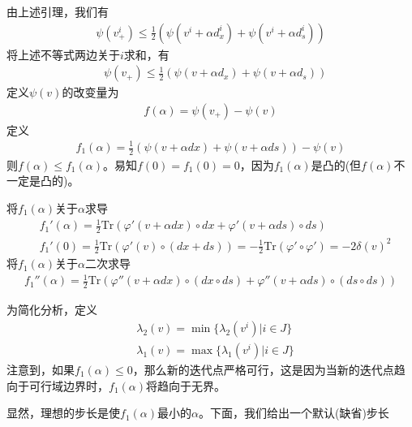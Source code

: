             \par
            由上述引理，我们有
            \begin{align*}
            \psi(v_{+}^i)\leqslant \frac 12 (\psi(v^i+\alpha d_x^i)+\psi(v^i+\alpha d_s^i))
            \end{align*}
            将上述不等式两边关于$i$求和，有
            \begin{align*}
            & \psi(v_{+})\leqslant \frac 12 (\psi(v+\alpha d_x)+\psi(v+\alpha d_s))
            \end{align*}
            定义$\psi(v)$的改变量为
            \begin{align*}
            f(\alpha)=\psi(v_{+})-\psi(v)
            \end{align*}
            定义
            \begin{align*}
            f_1(\alpha)=\frac 12 (\psi(v+\alpha dx)+\psi(v+\alpha ds))-\psi(v)
            \end{align*}
            则$f(\alpha)\leqslant f_1(\alpha)$。易知$f(0)=f_1(0)=0$，因为$f_1(\alpha)$是凸的(但$f(\alpha)$不一定是凸的)。
            \par
            将$f_1(\alpha)$关于${\alpha}$求导
            \begin{align*}
            & f_1'(\alpha)=\frac 12 \mathrm{Tr}(\varphi'(v+\alpha dx)\circ dx+\varphi'(v+\alpha ds)\circ ds)\\
            & f_1'(0)=\frac 12 \mathrm{Tr}(\varphi'(v)\circ(dx +ds))=-\frac 12 \mathrm{Tr}(\varphi'\circ\varphi' )=-2\delta (v)^2
            \end{align*}
            将$f_1(\alpha)$关于${\alpha}$二次求导
            \begin{align*}
            f_1''(\alpha)=\frac 12 \mathrm{Tr}(\varphi''(v+\alpha dx)\circ (dx\circ ds)+\varphi''(v+\alpha ds)\circ (ds\circ ds))
            \end{align*}
            \par
            为简化分析，定义
            \begin{align*}
            & {\lambda}_2(v)={\min}\{{\lambda}_2(v^i)|i \in J\}\\
            & {\lambda}_1(v)={\max}\{{\lambda}_1(v^i)|i \in J\}
            \end{align*}
            注意到，如果$f_1(\alpha)\leqslant 0$，那么新的迭代点严格可行，这是因为当新的迭代点趋向于可行域边界时，$f_1(\alpha)$将趋向于无界。
            \par
            显然，理想的步长是使$f_1(\alpha)$最小的$\alpha$。下面，我们给出一个默认(缺省)步长
